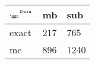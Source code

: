 \begin{tabular}{lll}
    \toprule
    $_{\text{\tiny{\ggn}}}$$^{\text{\tiny{Data}}}$ & mb & sub \\
    \midrule
    exact & 217
              & 765 \\
    mc   & 896
              & 1240 \\
    \bottomrule
\end{tabular}